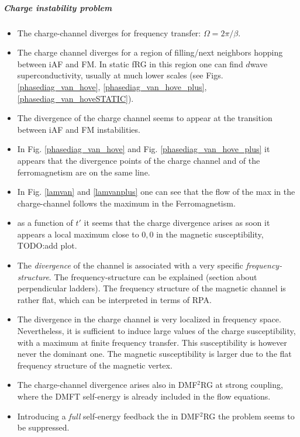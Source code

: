 \subparagraph{Charge instability problem}
 
\begin{itemize}
\item The charge-channel diverges for frequency transfer: $\Omega=2\pi/\beta$. 


\item The charge channel diverges for a region of filling/next neighbors hopping between iAF and FM. In static fRG in this region one can find $d$wave superconductivity, usually at much lower scales (see Figs. \ref{phasediag_van_hove}, \ref{phasediag_van_hove_plus}, \ref{phasediag_van_hoveSTATIC}).


\item The divergence of the charge channel seems to appear at the transition between iAF and FM instabilities. 

\item In Fig. \ref{phasediag_van_hove} and Fig. \ref{phasediag_van_hove_plus} it appears that the divergence points of the charge channel and of the ferromagnetism are on the same line. 

\item In Fig. \ref{lamvan} and \ref{lamvanplus} one can see that the flow of the max in the charge-channel follows the maximum in the Ferromagnetism. 

\item as a function of $t'$ it seems that the charge divergence arises as soon it appears a local maximum close to $0,0$ in the magnetic susceptibility, TODO:add plot. 

 
\item The \textit{divergence} of the channel is associated with a very specific \textit{frequency-structure}. The frequency-structure can be explained (section about perpendicular ladders). 
The frequency structure of the magnetic channel is rather flat, which can be interpreted in terms of RPA.
 
 \item The divergence in the charge channel is very localized in frequency space. 
Nevertheless, it is sufficient to induce large values of the charge susceptibility,  with a maximum at finite frequency transfer. This susceptibility is however never the dominant one. 
The magnetic susceptibility is larger due to the flat frequency structure of the magnetic vertex. 
 
\item The charge-channel divergence arises also in DMF$^2$RG at strong coupling, where the DMFT self-energy is already included in the flow equations.

\item Introducing a \emph{full} self-energy feedback the in DMF$^2$RG the problem seems to be suppressed. 

     
\end{itemize} 
 
